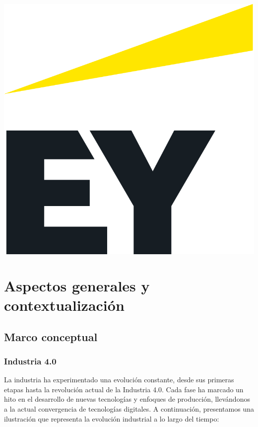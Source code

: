 \documentclass{article}[14pts]
\begin{document}
      \begin{center}
          \includegraphics[scale=0.15]{images/EY_logo.png}
      \end{center}

\section{Aspectos generales y contextualización}

  \subsection{Marco conceptual}

    \subsubsection{Industria 4.0}
      
    La industria ha experimentado una evolución constante, desde sus primeras etapas hasta la revolución actual de la Industria 4.0. Cada fase ha marcado un hito en el desarrollo de nuevas tecnologías y enfoques de producción, 
    llevándonos a la actual convergencia de tecnologías digitales. A continuación, presentamos una ilustración que 
    representa la evolución industrial a lo largo del tiempo:
\end{document}
